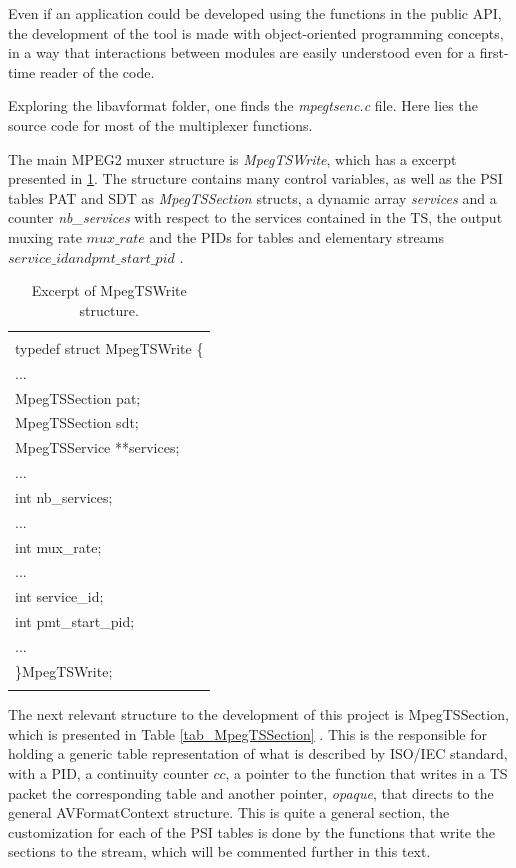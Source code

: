 \documentclass[
	12pt,				%
	openright,			%
	twoside,			%
	a4paper,			%
	brazil,
	french,				%
	english
	]{abntex2}
\begin{document}
Even if an application could be developed using the functions in the public API, the development of the tool is made with object-oriented programming concepts, in a way that interactions between modules are easily understood even for a first-time reader of the code.

Exploring the libavformat folder, one finds the \textit{mpegtsenc.c} file. Here lies the source code for most of the multiplexer functions. 

The main MPEG2 muxer structure is \textit{MpegTSWrite}, which has a excerpt presented in \ref{tab_MpegTSWrite}. The structure contains many control variables, as well as the PSI tables PAT and SDT as \textit{MpegTSSection} structs, a dynamic array \textit{services} and a counter \textit{nb\_services} with respect to the services contained in the TS, the output muxing rate \( \textit{mux\_rate} \) and the PIDs for tables and elementary streams \( \textit{service\_id} and \textit{pmt\_start\_pid} \) .

\begin{table}[!htpd]
\label{tab_MpegTSWrite}
\caption{ Excerpt of MpegTSWrite structure.}
\begin{center}
\begin{tabular}{|l|}
\hline
\\
typedef struct MpegTSWrite \{\\
...\\
MpegTSSection pat;\\
MpegTSSection sdt;\\
MpegTSService **services;\\
...\\
int nb\_services;\\
...\\
int mux\_rate;\\
...\\
int service\_id;\\
int pmt\_start\_pid;\\
...\\
 \}MpegTSWrite;\\
 \\
\hline
\end{tabular}
\end{center}
\end{table}

The next relevant structure to the development of this project is MpegTSSection, which is presented in Table \ref{tab_MpegTSSection} . This is the responsible for holding a generic table representation of what is described by ISO/IEC standard, with a PID, a continuity counter \(\textit{cc}\), a pointer to the function that writes in a TS packet the corresponding table and another pointer, \textit{opaque}, that directs to the general AVFormatContext structure. This is quite a general section, the customization for each of the PSI tables is done by the functions that write the sections to the stream, which will be commented further in this text.
\end{document}
